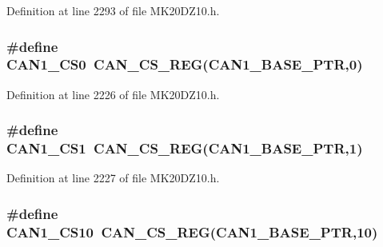 Definition at line 2293 of file M\+K20\+D\+Z10.\+h.

\subsubsection[{\texorpdfstring{C\+A\+N1\+\_\+\+C\+S0}{CAN1_CS0}}]{\setlength{\rightskip}{0pt plus 5cm}\#define C\+A\+N1\+\_\+\+C\+S0~{\bf C\+A\+N\+\_\+\+C\+S\+\_\+\+R\+EG}({\bf C\+A\+N1\+\_\+\+B\+A\+S\+E\+\_\+\+P\+TR},0)}\hypertarget{group___c_a_n___register___accessor___macros_ga8d22bb4362735d4e21346c713c00cad0}{}\label{group___c_a_n___register___accessor___macros_ga8d22bb4362735d4e21346c713c00cad0}


Definition at line 2226 of file M\+K20\+D\+Z10.\+h.

\subsubsection[{\texorpdfstring{C\+A\+N1\+\_\+\+C\+S1}{CAN1_CS1}}]{\setlength{\rightskip}{0pt plus 5cm}\#define C\+A\+N1\+\_\+\+C\+S1~{\bf C\+A\+N\+\_\+\+C\+S\+\_\+\+R\+EG}({\bf C\+A\+N1\+\_\+\+B\+A\+S\+E\+\_\+\+P\+TR},1)}\hypertarget{group___c_a_n___register___accessor___macros_ga72703a8c5d896bd9e2df1642fdd7e2ed}{}\label{group___c_a_n___register___accessor___macros_ga72703a8c5d896bd9e2df1642fdd7e2ed}


Definition at line 2227 of file M\+K20\+D\+Z10.\+h.

\subsubsection[{\texorpdfstring{C\+A\+N1\+\_\+\+C\+S10}{CAN1_CS10}}]{\setlength{\rightskip}{0pt plus 5cm}\#define C\+A\+N1\+\_\+\+C\+S10~{\bf C\+A\+N\+\_\+\+C\+S\+\_\+\+R\+EG}({\bf C\+A\+N1\+\_\+\+B\+A\+S\+E\+\_\+\+P\+TR},10)}\hypertarget{group___c_a_n___register___accessor___macros_gac2ab28969cb738a5a4bbd36d49606439}{}\label{group___c_a_n___register___accessor___macros_gac2ab28969cb738a5a4bbd36d49606439}


